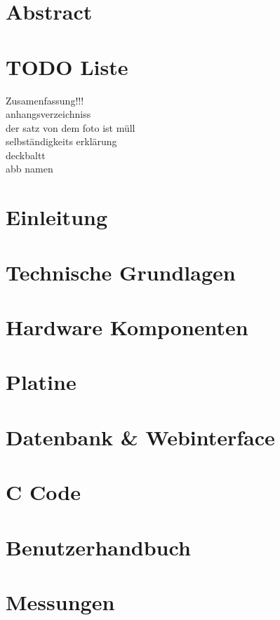 \documentclass[a4paper,oneside,12pt,titlepage]{scrartcl}   %
\begin{document}
\section*{Abstract}

\newpage
\tableofcontents
\newpage
\listoffigures
\newpage
\listoftables
\section{TODO Liste}
Zusamenfassung!!!\\
anhangsverzeichniss\\
der satz von dem foto ist müll\\
selbständigkeits erklärung\\
deckbaltt\\
abb namen\\


\newpage
\section{Einleitung}

\newpage
\section{Technische Grundlagen}

\newpage
\section{Hardware Komponenten}

\newpage
\section{Platine}

\newpage
\section{Datenbank \& Webinterface}

\newpage
\section{C Code}

\newpage
\section{Benutzerhandbuch}

\newpage
\section{Messungen}

\newpage
\end{document}
